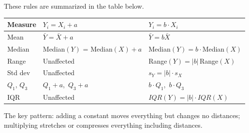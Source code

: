 These rules are summarized in the table below.

\begin{center}
\begin{tabular}{lll}
\textbf{Measure} & $Y_i = X_i + a$ & $Y_i = b \cdot X_i$ \\
\hline
Mean        & $\bar{Y} = \bar{X} + a$     & $\bar{Y} = b\bar{X}$ \\
Median      & Median$(Y)$ = Median$(X) + a$ & Median$(Y) = b \cdot$Median$(X)$ \\
Range       & Unaffected                  & Range$(Y) = |b|$\,Range$(X)$ \\
Std dev     & Unaffected                  & $s_Y = |b| \cdot s_X$ \\
$Q_1$, $Q_3$  & $Q_1 + a$,\ $Q_3 + a$      & $b \cdot Q_1$,\ $b \cdot Q_3$ \\
IQR         & Unaffected                  & $IQR(Y) = |b| \cdot IQR(X)$ \\
\end{tabular}
\end{center}

The key pattern: adding a constant moves everything but changes no
distances; multiplying stretches or compresses everything including
distances.


